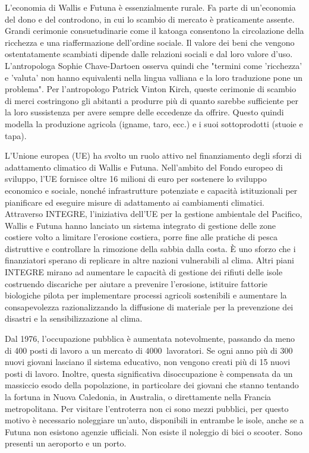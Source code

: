 \documentclass[fleqn,11pt]{SelfArx} %
\begin{document}
L'economia di Wallis e Futuna è essenzialmente rurale. 
Fa parte di un'economia del dono e del controdono, in cui lo scambio di mercato è praticamente assente.
Grandi cerimonie consuetudinarie come il katoaga consentono la circolazione della ricchezza e una riaffermazione dell'ordine sociale.
Il valore dei beni che vengono ostentatamente scambiati dipende dalle relazioni sociali e dal loro valore d'uso. 
L'antropologa Sophie Chave-Dartoen osserva quindi che "termini come 'ricchezza' e 'valuta' non hanno equivalenti nella lingua valliana e la loro traduzione pone un problema".
Per l'antropologo Patrick Vinton Kirch, queste cerimonie di scambio di merci costringono gli abitanti a produrre più di quanto sarebbe sufficiente per la loro sussistenza per avere sempre delle eccedenze da offrire.
Questo quindi modella la produzione agricola (igname, taro, ecc.) e i suoi sottoprodotti (stuoie e tapa).

L'Unione europea (UE) ha svolto un ruolo attivo nel finanziamento degli sforzi di adattamento climatico di Wallis e Futuna. Nell'ambito del Fondo europeo di sviluppo, l'UE fornisce oltre 16 milioni di euro per sostenere lo sviluppo economico e sociale, nonché infrastrutture potenziate e capacità istituzionali per pianificare ed eseguire misure di adattamento ai cambiamenti climatici.
Attraverso INTEGRE, l'iniziativa dell'UE per la gestione ambientale del Pacifico, Wallis e Futuna hanno lanciato un sistema integrato di gestione delle zone costiere volto a limitare l'erosione costiera, porre fine alle pratiche di pesca distruttive e controllare la rimozione della sabbia dalla costa. È uno sforzo che i finanziatori sperano di replicare in altre nazioni vulnerabili al clima.
Altri piani INTEGRE mirano ad aumentare le capacità di gestione dei rifiuti delle isole costruendo discariche per aiutare a prevenire l'erosione, istituire fattorie biologiche pilota per implementare processi agricoli sostenibili e aumentare la consapevolezza razionalizzando la diffusione di materiale per la prevenzione dei disastri e la sensibilizzazione al clima.

Dal 1976, l'occupazione pubblica è aumentata notevolmente, passando da meno di 400 posti di lavoro a un  mercato di \(\SI{4000}{}\) lavoratori.
Se ogni anno più di 300 nuovi giovani lasciano il sistema educativo, non vengono creati più di 15 nuovi posti di lavoro. 
Inoltre, questa significativa disoccupazione è compensata da un massiccio esodo della popolazione, in particolare dei giovani che stanno tentando la fortuna in Nuova Caledonia, in Australia, o direttamente nella Francia metropolitana. 
Per visitare l'entroterra non ci sono mezzi pubblici, per questo motivo è necessario noleggiare un'auto, disponibili in entrambe le isole, anche se a Futuna non esistono agenzie ufficiali.
Non esiste il noleggio di bici o scooter.
Sono presenti un aeroporto e un porto.
\end{document}

